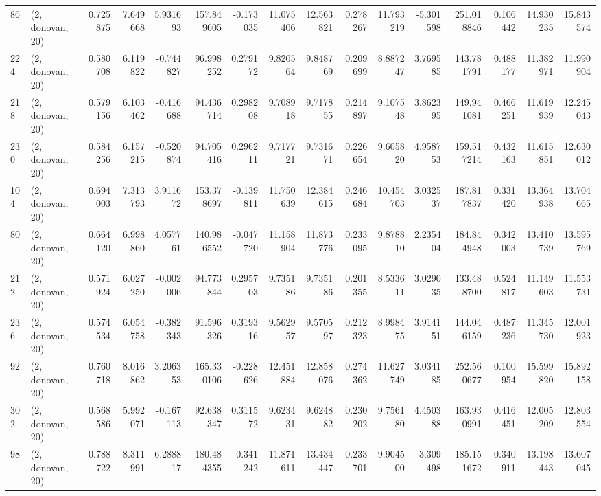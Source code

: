 \begin{tabular}{llrrrrrrrrrrrrrr}
86  &  (2, donovan, 20) &   0.725875 &   7.649668 &   5.931693 &   157.849605 &  -0.173035 &  11.075406 &  12.563821 &  0.278267 &  11.793219 &  -5.301598 &   251.018846 &  0.106442 &  14.930235 &  15.843574 \\
224 &  (2, donovan, 20) &   0.580708 &   6.119822 &  -0.744827 &    96.998252 &   0.279172 &   9.820564 &   9.848769 &  0.209699 &   8.887247 &   3.769585 &   143.781791 &  0.488177 &  11.382971 &  11.990904 \\
218 &  (2, donovan, 20) &   0.579156 &   6.103462 &  -0.416688 &    94.436714 &   0.298208 &   9.708918 &   9.717855 &  0.214897 &   9.107548 &   3.862395 &   149.941081 &  0.466251 &  11.619939 &  12.245043 \\
230 &  (2, donovan, 20) &   0.584256 &   6.157215 &  -0.520874 &    94.705416 &   0.296211 &   9.717721 &   9.731671 &  0.226654 &   9.605820 &   4.958753 &   159.517214 &  0.432163 &  11.615851 &  12.630012 \\
104 &  (2, donovan, 20) &   0.694003 &   7.313793 &   3.911672 &   153.378697 &  -0.139811 &  11.750639 &  12.384615 &  0.246684 &  10.454703 &   3.032537 &   187.817837 &  0.331420 &  13.364938 &  13.704665 \\
80  &  (2, donovan, 20) &   0.664120 &   6.998860 &   4.057761 &   140.986552 &  -0.047720 &  11.158904 &  11.873776 &  0.233095 &   9.878810 &   2.235404 &   184.844948 &  0.342003 &  13.410739 &  13.595769 \\
212 &  (2, donovan, 20) &   0.571924 &   6.027250 &  -0.002006 &    94.773844 &   0.295703 &   9.735186 &   9.735186 &  0.201355 &   8.533611 &   3.029035 &   133.488700 &  0.524817 &  11.149603 &  11.553731 \\
236 &  (2, donovan, 20) &   0.574534 &   6.054758 &  -0.382343 &    91.596326 &   0.319316 &   9.562957 &   9.570597 &  0.212323 &   8.998475 &   3.914151 &   144.046159 &  0.487236 &  11.345730 &  12.001923 \\
92  &  (2, donovan, 20) &   0.760718 &   8.016862 &   3.206353 &   165.330106 &  -0.228626 &  12.451884 &  12.858076 &  0.274362 &  11.627749 &   3.034185 &   252.560677 &  0.100954 &  15.599820 &  15.892158 \\
302 &  (2, donovan, 20) &   0.568586 &   5.992071 &  -0.167113 &    92.638347 &   0.311572 &   9.623431 &   9.624882 &  0.230202 &   9.756180 &   4.450388 &   163.930991 &  0.416451 &  12.005209 &  12.803554 \\
98  &  (2, donovan, 20) &   0.788722 &   8.311991 &   6.288817 &   180.484355 &  -0.341242 &  11.871611 &  13.434447 &  0.233701 &   9.904500 &  -3.309498 &   185.151672 &  0.340911 &  13.198443 &  13.607045 \\

\end{tabular}

